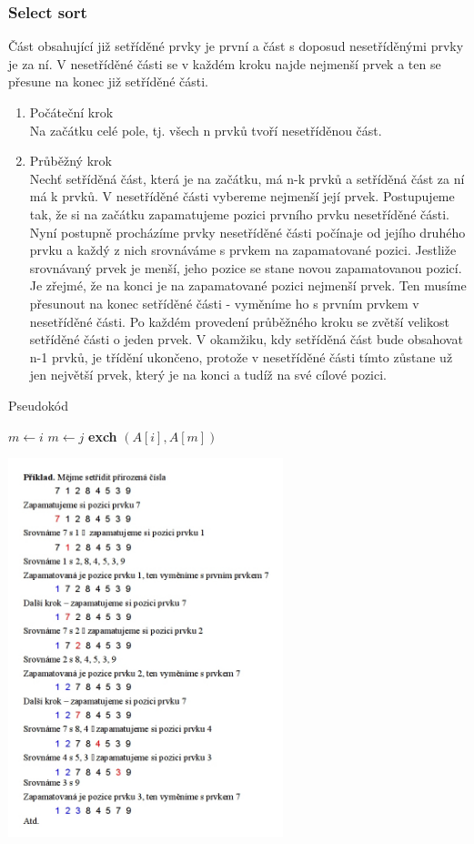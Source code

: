\documentclass[10pt,a4paper]{article}
\begin{document}
\subsubsection{Select sort}
Část obsahující již setříděné prvky je první a část s doposud nesetříděnými prvky je za ní. V nesetříděné části se v každém kroku najde nejmenší prvek a ten se přesune na konec již setříděné části.
\begin{enumerate}
	\item Počáteční krok \\
	Na začátku celé pole, tj. všech n prvků tvoří nesetříděnou část.
	\item Průběžný krok \\
	Nechť setříděná část, která je na začátku, má n-k prvků a setříděná část za ní má k prvků. V nesetříděné části vybereme nejmenší její prvek. Postupujeme tak, že si na začátku zapamatujeme pozici prvního prvku nesetříděné části. Nyní postupně procházíme prvky nesetříděné části počínaje od jejího druhého prvku a každý z nich srovnáváme s prvkem na zapamatované pozici. Jestliže srovnávaný prvek je menší, jeho pozice se stane novou zapamatovanou pozicí. Je zřejmé, že na konci je na zapamatované pozici nejmenší prvek. Ten musíme přesunout na konec setříděné části - vyměníme ho s prvním prvkem v nesetříděné části. Po každém provedení průběžného kroku se zvětší velikost setříděné části o jeden prvek. V okamžiku, kdy setříděná část bude obsahovat n-1 prvků, je třídění ukončeno, protože v nesetříděné části tímto zůstane už jen největší prvek, který je na konci a tudíž na své cílové pozici.
\end{enumerate}
\begin{algorithm}
\caption{Pseudokód}
\begin{algorithmic}[]
	\State $m \gets i$
			\State $m \gets j$
		\EndIf
	\EndFor
	\textbf{exch} $(A[i], A[m])$
\EndFor
\EndProcedure
\end{algorithmic}
\end{algorithm}
\newpage
\includegraphics[width=8cm]{img/select}
\end{document}
